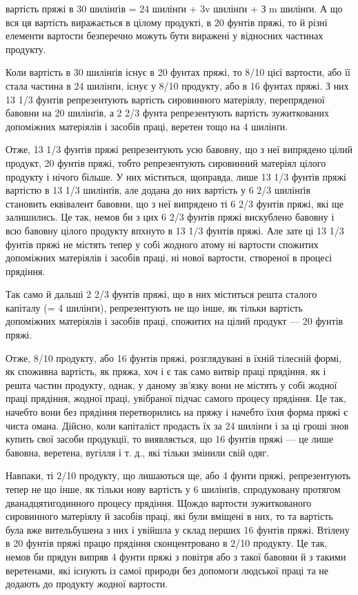 вартість пряжі в 30 шилінґів = 24 шилінґи + 3v шилінґи + З m шилінґи. А що вся ця вартість
виражається в цілому продукті, в 20 фунтів пряжі, то й різні елементи вартости безперечно можуть
бути
виражені у відносних частинах продукту.

Коли вартість в 30 шилінґів існує в 20 фунтах пряжі, то 8/10 цієї вартости, або її стала частина в
24 шилінґи, існує у 8/10 продукту, або в 16 фунтах пряжі. З них 13 1/3 фунтів репрезентують вартість
сировинного матеріялу, перепряденої бавовни на 20 шилінґів, а 2 2/3 фунта репрезентують вартість
зужиткованих допоміжних матеріялів і засобів праці, веретен тощо на 4 шилінґи.

Отже, 13 1/3 фунтів пряжі репрезентують усю бавовну, що з неї випрядено цілий продукт, 20 фунтів
пряжі, тобто репрезентують сировинний матеріял цілого продукту і нічого більше. У них міститься,
щоправда, лише 13 1/3 фунтів пряжі вартістю в 13 1/3 шилінґів, але додана до них вартість у 6 2/3
шилінґів становить еквівалент бавовни, що з неї випрядено ті 6 2/3 фунтів пряжі, які ще залишились.
Це так, немов би з цих 6 2/3 фунтів пряжі вискублено бавовну і всю бавовну цілого продукту впхнуто в
13 1/3 фунтів пряжі. Але зате ці 13 1/3 фунтів пряжі не містять тепер у собі жодного атому ні
вартости спожитих допоміжних матеріялів і засобів праці, ні нової вартости, створеної в процесі
прядіння.

Так само й дальші 2 2/3 фунтів пряжі, що в них міститься решта сталого капіталу (= 4 шилінґи),
репрезентують не що інше, як
тільки вартість допоміжних матеріялів і засобів праці, спожитих на цілий продукт — 20 фунтів пряжі.

Отже, 8/10 продукту, або 16 фунтів пряжі, розглядувані в їхній тілесній формі, як споживна вартість,
як пряжа, хоч і
є так само витвір праці прядіння, як і решта частин продукту, однак, у даному зв’язку вони не
містять у собі жодної праці прядіння, жодної праці, увібраної підчас самого процесу прядіння. Це
так, начебто вони без прядіння перетворились на пряжу і начебто їхня форма пряжі є чиста омана.
Дійсно, коли капіталіст продасть їх за 24 шилінґи і за ці гроші знов купить свої засоби продукції,
то виявляється, що 16 фунтів пряжі — це лише бавовна, веретена, вугілля і т. д., які тільки змінили
свій одяг.

Навпаки, ті 2/10 продукту, що лишаються ще, або 4 фунти пряжі, репрезентують тепер не що інше, як
тільки нову вартість
у 6 шилінґів, спродуковану протягом дванадцятигодинного процесу прядіння. Щождо вартости
зужиткованого сировинного матеріялу й засобів праці, які були вміщені в них, то та вартість була вже
вительбушена з них і увійшла у склад перших 16 фунтів пряжі. Втілену в 20 фунтів пряжі працю
прядіння сконцентровано
в 2/10 продукту. Це так, немов би прядун випряв 4 фунти пряжі з повітря або з такої бавовни й з
такими веретенами, які
існують із самої природи без допомоги людської праці та не додають до продукту жодної вартости.
